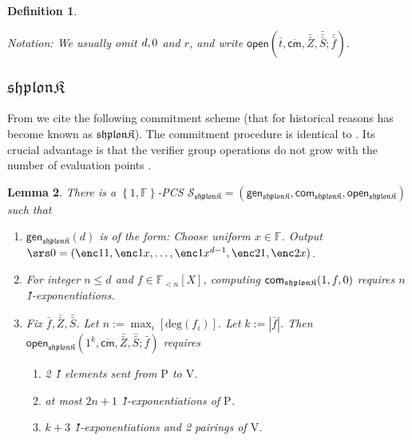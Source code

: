 \documentclass[11pt]{article} %
\newcommand{\F}{\ensuremath{\mathbb F}\xspace}
\newcommand{\cmm}{\ensuremath{\mathsf{\overline{cm}}}\xspace}
\newcommand{\open}{\ensuremath{\mathsf{open}}\xspace}
\renewcommand{\deg}{\ensuremath{\mathrm{deg}}\xspace}
\newcommand{\defeq}{:=}
\newcommand{\prvpc}{\ensuremath{\mathrm{P}}\xspace}%
\newcommand{\verpc}{\ensuremath{\mathrm{V}}\xspace}%
\newcommand{\shplonk}{\ensuremath{\mathfrak{sh}\mathfrak{p}\mathfrak{lon}\mathfrak{K}}\xspace}
\newcommand{\set}[1]{\ensuremath{\left\{#1\right\}}\xspace}
\newcommand{\polysofdeg}[1]{\ensuremath{\F_{< #1}[X]}\xspace}
\newtheorem{lemma}{Lemma}[section]
\newtheorem{dfn}[lemma]{Definition}
\newcommand{\Z}{\mathbb{Z}}
\newcommand{\f}{\ensuremath{\bar{f}}\xspace}
\renewcommand{\t}{\ensuremath{\bar{t}}\xspace}
\newcommand{\ff}{\ensuremath{\bar{\bar{f}}}\xspace}
\renewcommand{\Z}{\ensuremath{\bar{Z}}\xspace}
\newcommand{\ZZ}{\ensuremath{\bar{\bar{Z}}}\xspace}
\renewcommand{\SS}{\ensuremath{\bar{\bar{S}}}\xspace}
\newcommand{\SSS}{\ensuremath{\bar{\bar{\bar{S}}}}\xspace}
\newcommand{\openshplonk}{\ensuremath{\mathsf{open_{\shplonk}}}\xspace}
\newcommand{\PCschemeshplonk}{\ensuremath{\mathscr{S_{\shplonk}}}\xspace}
\newcommand{\genshplonk}{\ensuremath{\mathsf{gen_{\shplonk}}}\xspace}
\newcommand{\comshplonk}{\ensuremath{\mathsf{com_{\shplonk}}}\xspace}
\begin{document}
\begin{dfn}
\begin{itemize}
\begin{itemize}
\begin{enumerate}
 \end{enumerate}

\end{itemize}
\end{itemize}
\textit{Notation:} We usually omit $d,\srs0$ and $r$, and write $\open(\t,\cmm,\ZZ,\SSS;\ff)$.
\end{dfn}

\subsection{\shplonk}
From \cite{shplonk} we cite the following commitment scheme (that for historical reasons has become known as \shplonk). The commitment procedure is identical to \cite{kate}. Its crucial advantage is that the verifier group operations do not grow with the number of evaluation points .
\begin{lemma}\label{lem:shplonk}
There is a $\set{1,\F}$-PCS $\PCschemeshplonk=(\genshplonk,\comshplonk,\openshplonk)$ such that
  \begin{enumerate}
  \item $\genshplonk(d)$ is of the form: Choose uniform $x\in \F$. Output $\srs0 =(\enc1{1},\enc1{x},\ldots,\enc1{x^{d-1}},\enc2{1},\enc2{x})$.
  \item For integer $n\leq d$ and $f\in \polysofdeg{n}$, computing $\comshplonk(1,f,\srs0)$ requires $n$ \G1-exponentiations.
   \item Fix $\f,\ZZ,\SS$. Let $n\defeq \max_{i} \left[\deg(f_{i})\right]$. Let $k\defeq |\f|$.
   Then $\openshplonk\left(1^k,\cmm,\ZZ,\SS;\f\right)$ requires

    \begin{enumerate}
    \item 2 \G1 elements sent from \prvpc to \verpc.
    \item at most $2n+1$ \G1-exponentiations of \prvpc.
    \item $k+3$ \G1-exponentiations and 2 pairings of \verpc.
\end{enumerate}
\end{enumerate}
\end{lemma}
\end{document}
